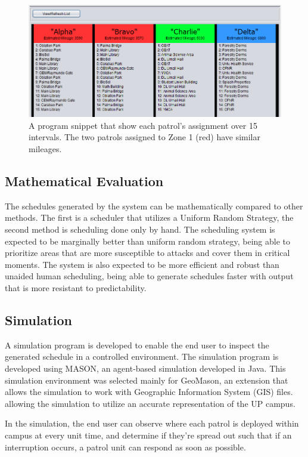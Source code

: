 \documentclass[journal]{./IEEE/IEEEtran}
\begin{document}
\begin{figure}[h]
\begin{center}
\includegraphics[scale=0.35]{./Images/patrolsPanel.png}
\caption{A program snippet that show each patrol's assignment over 15 intervals. The two patrols assigned to Zone 1 (red) have similar mileages.}
\end{center}
\end{figure}

\subsection{Mathematical Evaluation}
The schedules generated by the system can be mathematically compared to other methods. The first is a scheduler that utilizes a Uniform Random Strategy, the second method is scheduling done only by hand. The scheduling system is expected to be marginally better than uniform random strategy, being able to prioritize areas that are more susceptible to attacks and cover them in critical moments. The system is also expected to be more efficient and robust than unaided human scheduling, being able to generate schedules faster with output that is more resistant to predictability. 

\subsection{Simulation}
A simulation program is developed to enable the end user to inspect the generated schedule in a controlled environment. The simulation program is developed using MASON, an agent-based simulation developed in Java. This simulation environment was selected mainly for GeoMason, an extension that allows the simulation to work with Geographic Information System (GIS) files. allowing the simulation to utilize an accurate representation of the UP campus.

In the simulation, the end user can observe where each patrol is deployed within campus at every unit time, and determine if they're spread out such that if an interruption occurs, a patrol unit can respond as soon as possible. 
\end{document}
